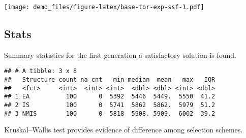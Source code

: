 \documentclass[]{book}
\newenvironment{Shaded}{\begin{snugshade}}{\end{snugshade}}
\newcommand{\CharTok}[1]{\textcolor[rgb]{0.31,0.60,0.02}{#1}}
\newcommand{\DataTypeTok}[1]{\textcolor[rgb]{0.13,0.29,0.53}{#1}}
\newcommand{\DecValTok}[1]{\textcolor[rgb]{0.00,0.00,0.81}{#1}}
\newcommand{\KeywordTok}[1]{\textcolor[rgb]{0.13,0.29,0.53}{\textbf{#1}}}
\newcommand{\NormalTok}[1]{#1}
\newcommand{\OperatorTok}[1]{\textcolor[rgb]{0.81,0.36,0.00}{\textbf{#1}}}
\newcommand{\OtherTok}[1]{\textcolor[rgb]{0.56,0.35,0.01}{#1}}
\newcommand{\StringTok}[1]{\textcolor[rgb]{0.31,0.60,0.02}{#1}}
\begin{document}
\texttt{[image: demo\_files/figure-latex/base-tor-exp-ssf-1.pdf]}

\hypertarget{stats-1}{%
\subsection{Stats}\label{stats-1}}

Summary statistics for the first generation a satisfactory solution is found.

\begin{Shaded}
\end{Shaded}

\begin{verbatim}
## # A tibble: 3 x 8
##   Structure count na_cnt   min median  mean   max   IQR
##   <fct>     <int>  <int> <int>  <dbl> <dbl> <int> <dbl>
## 1 EA          100      0  5392  5446  5449.  5550  41.2
## 2 IS          100      0  5741  5862  5862.  5979  51.2
## 3 NMIS        100      0  5818  5908. 5909.  6002  39.2
\end{verbatim}

Kruskal--Wallis test provides evidence of difference among selection schemes.
\end{document}
